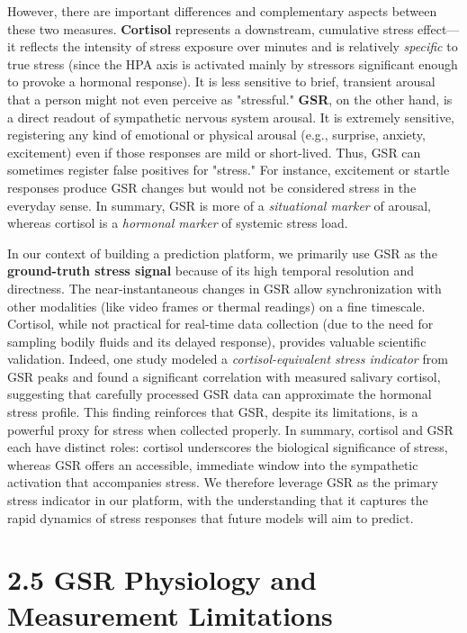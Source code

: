 \documentclass[11pt,a4paper]{report}
\begin{document}
However, there are important differences and complementary aspects between these two measures. \textbf{Cortisol} represents a downstream, cumulative stress effect—it reflects the intensity of stress exposure over minutes and is relatively \textit{specific} to true stress (since the HPA axis is activated mainly by stressors significant enough to provoke a hormonal response). It is less sensitive to brief, transient arousal that a person might not even perceive as "stressful." \textbf{GSR}, on the other hand, is a direct readout of sympathetic nervous system arousal. It is extremely sensitive, registering any kind of emotional or physical arousal (e.g., surprise, anxiety, excitement) even if those responses are mild or short-lived\cite{GSRPPGMachineLearning2024}. Thus, GSR can sometimes register false positives for "stress." For instance, excitement or startle responses produce GSR changes but would not be considered stress in the everyday sense. In summary, GSR is more of a \textit{situational marker} of arousal, whereas cortisol is a \textit{hormonal marker} of systemic stress load\cite{SimulatorValidityPhysiological2025}.

In our context of building a prediction platform, we primarily use GSR as the \textbf{ground-truth stress signal} because of its high temporal resolution and directness. The near-instantaneous changes in GSR allow synchronization with other modalities (like video frames or thermal readings) on a fine timescale. Cortisol, while not practical for real-time data collection (due to the need for sampling bodily fluids and its delayed response), provides valuable scientific validation. Indeed, one study modeled a \textit{cortisol-equivalent stress indicator} from GSR peaks and found a significant correlation with measured salivary cortisol\cite{CortisolStressIndicator2020}, suggesting that carefully processed GSR data can approximate the hormonal stress profile. This finding reinforces that GSR, despite its limitations, is a powerful proxy for stress when collected properly. In summary, cortisol and GSR each have distinct roles: cortisol underscores the biological significance of stress, whereas GSR offers an accessible, immediate window into the sympathetic activation that accompanies stress. We therefore leverage GSR as the primary stress indicator in our platform, with the understanding that it captures the rapid dynamics of stress responses that future models will aim to predict.

\section{2.5 GSR Physiology and Measurement Limitations}
\end{document}
